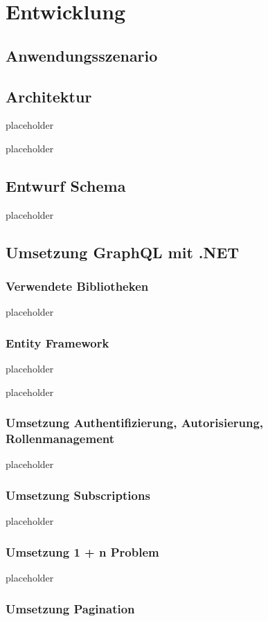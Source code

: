 \chapter{Entwicklung}

\section{Anwendungsszenario}

\section{Architektur}

placeholder
\pagebreak

placeholder
\pagebreak

\section{Entwurf Schema}

placeholder
\pagebreak

\section{Umsetzung GraphQL mit .NET}

\subsection{Verwendete Bibliotheken}

placeholder
\pagebreak

\subsection{Entity Framework}

placeholder
\pagebreak

placeholder
\pagebreak

\subsection{Umsetzung Authentifizierung, Autorisierung, Rollenmanagement}

placeholder
\pagebreak

\subsection{Umsetzung Subscriptions}

placeholder
\pagebreak

\subsection{Umsetzung 1 + n Problem}

placeholder
\pagebreak

\subsection{Umsetzung Pagination}

